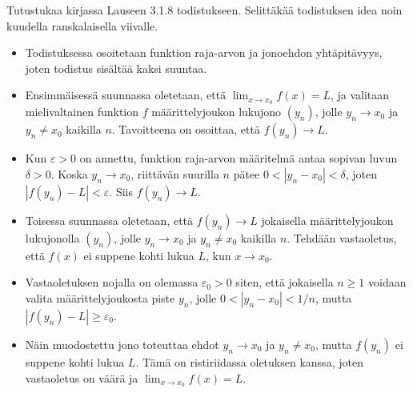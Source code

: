 \documentclass[11pt,a4paper]{amsart}
\begin{document}
\begin{exercise}
Tutustukaa kirjassa Lauseen 3.1.8 todistukseen. Selittäkää todistuksen
idea noin kuudella ranskalaisella viivalle.
\end{exercise}

\begin{solution}
\leavevmode\par
\begin{itemize}[label=--, nosep]
  \item Todistuksessa osoitetaan funktion raja-arvon ja jonoehdon
    yhtäpitävyys, joten todistus sisältää kaksi suuntaa.
  \item Ensimmäisessä suunnassa oletetaan, että \(\lim_{x \to x_0} f(x) = L\),
    ja valitaan mielivaltainen funktion \(f\) määrittelyjoukon lukujono
    \((y_n)\), jolle \(y_n \to x_0\) ja \(y_n \neq x_0\) kaikilla \(n\).
    Tavoitteena on osoittaa, että \(f(y_n) \to L\).
  \item Kun \(\varepsilon>0\) on annettu, funktion raja-arvon määritelmä
    antaa sopivan luvun \(\delta>0\). Koska \(y_n \to x_0\), riittävän
    suurilla \(n\) pätee \(0<|y_n-x_0|<\delta\), joten
    \(|f(y_n)-L|<\varepsilon\). Siis \(f(y_n) \to L\).
  \item Toisessa suunnassa oletetaan, että \(f(y_n) \to L\) jokaisella
    määrittelyjoukon lukujonolla \((y_n)\), jolle \(y_n \to x_0\) ja
    \(y_n \neq x_0\) kaikilla \(n\). Tehdään vastaoletus, että
    \(f(x)\) ei suppene kohti lukua \(L\), kun \(x \to x_0\).
  \item Vastaoletuksen nojalla on olemassa \(\varepsilon_0>0\) siten,
    että jokaisella \(n\ge 1\) voidaan valita määrittelyjoukosta piste
    \(y_n\), jolle \(0<|y_n-x_0|<1/n\), mutta
    \(|f(y_n)-L|\ge\varepsilon_0\).
  \item Näin muodostettu jono toteuttaa ehdot \(y_n \to x_0\) ja
    \(y_n \neq x_0\), mutta \(f(y_n)\) ei suppene kohti lukua \(L\).
    Tämä on ristiriidassa oletuksen kanssa, joten vastaoletus on väärä
    ja \(\lim_{x \to x_0} f(x)=L\).
\end{itemize}
\end{solution}
\end{document}
